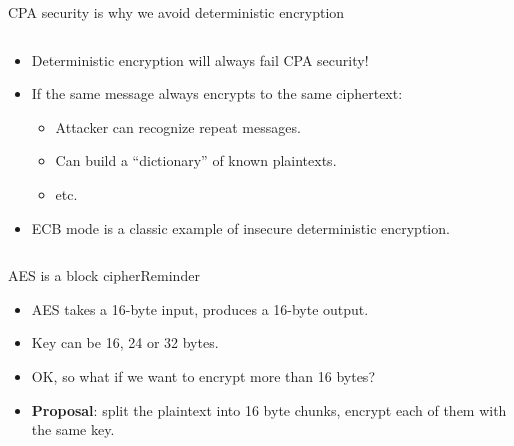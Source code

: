 \documentclass[aspectratio=169, lualatex, handout]{beamer}
\begin{document}
\begin{frame}{CPA security is why we avoid deterministic encryption}
	\begin{columns}[c]
		\begin{column}{0.5\textwidth}
			\begin{itemize}
				\item Deterministic encryption will always fail CPA security!
				\item If the same message always encrypts to the same ciphertext:
				      \begin{itemize}
					      \item Attacker can recognize repeat messages.
					      \item Can build a ``dictionary'' of known plaintexts.
					      \item etc.
				      \end{itemize}
				\item ECB mode is a classic example of insecure deterministic encryption.
			\end{itemize}
		\end{column}
		\begin{column}{0.5\textwidth}
			\begin{center}
			\end{center}
		\end{column}
	\end{columns}
\end{frame}

\begin{frame}{AES is a block cipher}{Reminder}
	\begin{itemize}
		\item<1-2> AES takes a 16-byte input, produces a 16-byte output.
		\item<1-2> Key can be 16, 24 or 32 bytes.
		\item<1-2> OK, so what if we want to encrypt more than 16 bytes? \pause
		\item<2-2> \textbf{Proposal}: split the plaintext into 16 byte chunks, encrypt each of them with the same key.
	\end{itemize}
\end{frame}
\end{document}
